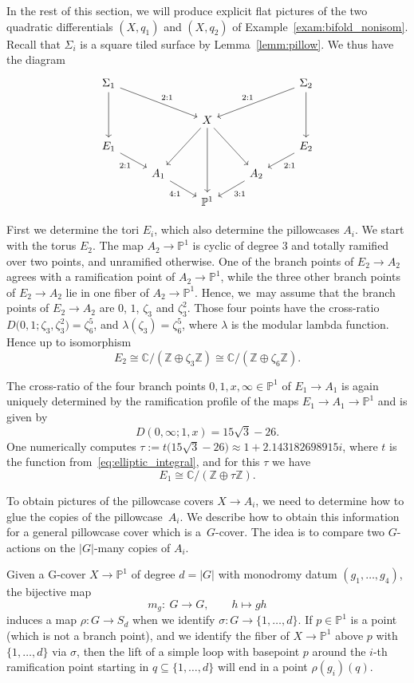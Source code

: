 \documentclass[pdftex]{sigma}
\numberwithin{equation}{section}
\theoremstyle{definition}
\renewcommand{\to}{\rightarrow}
\newcommand{\ZZ}{\mathbb{Z}}
\newcommand{\Z}{\mathbb{Z}}
\newcommand{\CC}{\mathbb{C}}
\newcommand{\PP}{\mathbb{P}}
\begin{document}
In the rest of this section, we will produce explicit flat pictures of the two quadratic differentials $(X, q_1)$ and $(X, q_2)$ of Example~\ref{exam:bifold_nonisom}.
Recall that $\Sigma_i$ is a square tiled surface by Lemma~\ref{lemm:pillow}.
We thus have the diagram
\[
\begin{tikzcd}[row sep=small]
	\Sigma_1\ar[ddrr, "2:1"]\ar[ddd] &&&& \Sigma_2\ar[ddll, "2:1"']\ar[ddd] \\
	\\
	&& X\ar[ddd]\ar[ddl]\ar[ddr] && \\
	E_1\ar[dr, "2:1"'] &&&& E_2\ar[dl, "2:1"] \\
	& A_1\ar[dr, "4:1"'] && A_2\ar[dl, "3:1"] & \\
	&& \PP^1 &&
\end{tikzcd}
\]

First we determine the tori $E_i$, which also determine the pillowcases $A_i$. We start with the torus $E_2$.
The map $A_2 \to \PP^1$ is cyclic of degree $3$ and totally ramified over two points, and unramified otherwise. One of the branch points of $E_2 \to A_2$ agrees with a ramification point of $A_2 \to \PP^1$, while the three other branch points of $E_2 \to A_2$ lie in one fiber of $A_2 \to \PP^1$.
Hence, we~may assume that the branch points of $E_2 \to A_2$ are $0$, $1$, $\zeta_3$ and $\zeta_3^2$.
Those four points have the cross-ratio $D\bigl(0,1;\zeta_3,\zeta_3^2\bigr) = \zeta_6^5$, and $\lambda(\zeta_3) = \zeta_6^5$, where $\lambda$ is the modular lambda function.
Hence up to isomorphism
\[
	E_2 \cong \CC / (\ZZ \oplus \zeta_3 \Z) \cong \CC / (\ZZ \oplus \zeta_6 \ZZ).
\]

The cross-ratio of the four branch points $0, 1, x,\infty\in\PP^1$ of $E_1 \to A_1$ is again uniquely determined by the ramification profile of the maps $E_1 \to A_1 \to \PP^1$ and is given by
\[
	D(0,\infty;1,x) = 15\sqrt{3}-26.
\]
One numerically computes $\tau := t\bigl(15\sqrt{3}-26\bigr)\approx 1 + 2.143182698915i$, where $t$ is the function from~\eqref{eq:elliptic_integral}, and for this $\tau$ we have
\[
	E_1 \cong \CC / (\ZZ \oplus \tau\ZZ).
\]

To obtain pictures of the pillowcase covers $X \to A_i$, we need to determine how to glue the copies of the pillowcase~$A_i$.
We describe how to obtain this information for a general pillowcase cover which is a~$G$-cover.
The idea is to compare two $G$-actions on the $|G|$-many copies of $A_i$.

Given a G-cover $X \to \PP^1$ of degree $d=|G|$ with monodromy datum $(g_1, \dots, g_4)$, the bijective map
\[
	m_g\colon \ G \to G, \qquad h \mapsto gh
\]
induces a map $\rho\colon G \to S_d$ when we identify $\sigma\colon G \to \{1, \dots, d\}$.
If $p \in \PP^1$ is a point (which is not a branch point), and we identify the fiber of $X \to \PP^1$ above $p$ with $\{1, \dots, d\}$ via $\sigma$, then the lift of a simple loop with basepoint $p$ around the $i$-th ramification point starting in $q \subseteq \{1, \dots, d\}$ will end in a point $\rho(g_i)(q)$.
\end{document}
